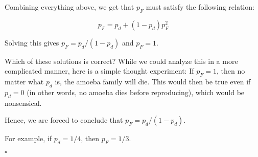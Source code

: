 
Combining everything above, we get that $p_F$ must satisfy the following relation:

\begin{equation}
p_F = p_d + (1-p_d)p_F^2
\end{equation}

Solving this gives $p_F = p_d / (1 - p_d)$ and $p_F = 1$. 

Which of these solutions is correct? While we could analyze this in a more complicated manner, here is a simple thought experiment: If $p_F = 1$, then no matter what $p_d$ is, the amoeba family will die. This would then be true even if $p_d = 0$ (in other words, no amoeba dies before reproducing), which would be nonsensical. 


Hence, we are forced to conclude that $p_F = p_d / (1 - p_d)$.


For example, if $p_d = 1/4$, then $p_F = 1/3$.

$\square$









